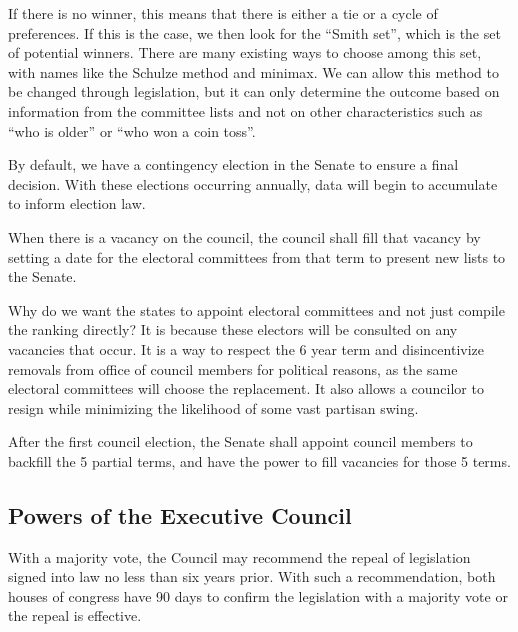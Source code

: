 \documentclass{article}
\newcommand{\quotes}[1]{``#1''}
\begin{document}
If there is no winner, this means that there is either a tie or a cycle of preferences. If this is the case, we then look for the \quotes{Smith set}\cite{Smith_Set}, which is the set of potential winners. There are many existing ways to choose among this set, with names like the Schulze method\cite{Schulze} and minimax. We can allow this method to be changed through legislation, but it can only determine the outcome based on information from the committee lists and not on other characteristics such as \quotes{who is older} or \quotes{who won a coin toss}.

By default, we have a contingency election in the Senate to ensure a final decision. With these elections occurring annually, data will begin to accumulate to inform election law.

\begin{quoting}
When there is a vacancy on the council, the council shall fill that vacancy by setting a date for the electoral committees from that term to present new lists to the Senate.
\end{quoting}

Why do we want the states to appoint electoral committees and not just compile the ranking directly? It is because these electors will be consulted on any vacancies that occur. It is a way to respect the 6 year term and disincentivize removals from office of council members for political reasons, as the same electoral committees will choose the replacement. It also allows a councilor to resign while minimizing the likelihood of some vast partisan swing.

\begin{quoting}
After the first council election, the Senate shall appoint council members to backfill the 5 partial terms, and have the power to fill vacancies for those 5 terms.
\end{quoting}

\subsection{Powers of the Executive Council}

\begin{quoting}
With a majority vote, the Council may recommend the repeal of legislation signed into law no less than six years prior. With such a recommendation, both houses of congress have 90 days to confirm the legislation with a majority vote or the repeal is effective.
\end{quoting}
\end{document}
